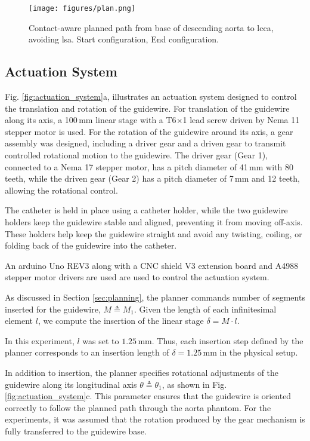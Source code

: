 \begin{figure}[t] 
    \centering
    \texttt{[image: figures/plan.png]}
    \caption{Contact-aware planned path from base of descending aorta to \gls{lcca}, avoiding \gls{lsa}.  Start configuration,  End configuration.}
    \label{fig:plan}
\end{figure}


\subsection{Actuation System}

\label{subsect:actuation_system}
Fig. \ref{fig:actuation_system}a, illustrates an actuation system designed to control the translation and rotation of the guidewire. For translation of the guidewire along its axis, a 100\,mm linear stage with a T6$\times$1 lead screw driven by Nema 11 stepper motor is used. For the rotation of the guidewire around its axis, a gear assembly was designed, including a driver gear and a driven gear to transmit controlled rotational motion to the guidewire. The driver gear (Gear 1), connected to a Nema 17 stepper motor, has a pitch diameter of 41\,mm with 80 teeth, while the driven gear (Gear 2) has a pitch diameter of 7\,mm and 12 teeth, allowing the rotational control. 

The catheter is held in place using a catheter holder, while the two guidewire holders keep the guidewire stable and aligned, preventing it from moving off-axis. These holders help keep the guidewire straight and avoid any twisting, coiling, or folding back of the guidewire into the catheter.

An arduino Uno REV3 along with a CNC shield V3 extension board and A4988 stepper motor drivers are used are used to control the actuation system.

As discussed in Section \ref{sec:planning}, the planner commands number of segments inserted for the guidewire, $M \triangleq M_1$. Given the length of each infinitesimal element $l$, we compute the insertion of the linear stage $\delta = M \cdot l$.

In this experiment, $l$ was set to $1.25$\,mm. Thus, each insertion step defined by the planner corresponds to an insertion length of $\delta = 1.25$\,mm in the physical setup.

In addition to insertion, the planner specifies rotational adjustments of the guidewire along its longitudinal axis $\theta \triangleq \theta_1$, as shown in Fig. \ref{fig:actuation_system}c. This parameter ensures that the guidewire is oriented correctly to follow the planned path through the aorta phantom. For the experiments, it was assumed that the rotation produced by the gear mechanism is fully transferred to the guidewire base. 


